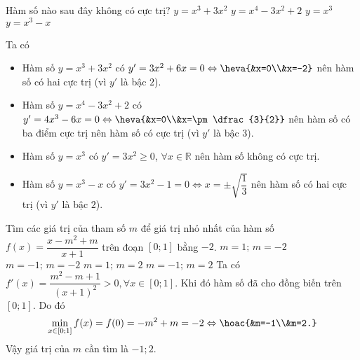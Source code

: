 \begin{ex}%
    Hàm số nào sau đây không có cực trị?
    \choice
    {$y=x^3+3x^2$}
    {$y=x^4-3x^2+2$}
    {\True $y=x^3$}
    {$y=x^3-x$}
    \loigiai
    {Ta có
        \begin{itemize}
            \item Hàm số $y=x^3+3x^2$ có $y'=3x^2+6x=0\Leftrightarrow\heva{&x=0\\&x=-2}$ nên hàm số có hai cực trị (vì $y'$ là bậc $2$).
            \item  Hàm số $y=x^4-3x^2+2$ có $y'=4x^3-6x=0\Leftrightarrow\heva{&x=0\\&x=\pm \dfrac{3}{2}}$ nên hàm số có ba điểm cực trị nên hàm số có cực trị (vì $y'$ là bậc $3$).
            \item Hàm số $y=x^3$ có $y'=3x^2\ge 0$, $\forall x\in \mathbb{R}$ nên hàm số không có cực trị.
            \item Hàm số $y=x^3-x$ có $y'=3x^2-1=0\Leftrightarrow x=\pm \sqrt{\dfrac{1}{3}}$ nên hàm số có hai cực trị (vì $y'$ là bậc $2$).
    \end{itemize}}
\end{ex}

\begin{ex}%
	Tìm các giá trị của tham số $m$ để giá trị nhỏ nhất của hàm số $f(x)=\dfrac{x-m^2+m}{x+1}$ trên đoạn $[0; 1]$ bằng $-2$.
	\choice
	{$m=1;\,m=-2$}
	{$m=-1;\,m=-2$}
	{$m=1;\,m=2$}
	{\True $m=-1;\,m=2$}
	\loigiai
	{Ta có $f'(x)=\dfrac{m^2-m+1}{(x+1)^2}>0, \forall x\in [0;1]$. Khi đó hàm số đã cho đồng biến trên $[0;1]$. Do đó
		\[\min\limits_{x\in[0;1]} f(x)=f(0)=-m^2+m=-2\Leftrightarrow \hoac{&m=-1\\&m=2.}\]
Vậy giá trị của $m$ cần tìm là $-1;2$.	}
\end{ex}

